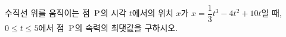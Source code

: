 수직선 위를 움직이는 점~$\mathrm{P}$의 시각 $t$에서의 위치 $x$가 $x=\dfrac{1}{3}t^3-4t^2+10t$일 때, $0\le t\le 5$에서 점~$\mathrm{P}$의 속력의 최댓값을 구하시오.
